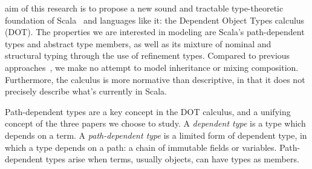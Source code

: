 \documentclass[10pt,journal,a4paper]{IEEEtran}
\begin{document}

 aim of this research is to propose a new sound
and tractable type-theoretic foundation of Scala~\cite{ScalaOverview} and languages like
it: the Dependent Object Types calculus (DOT). The properties we are
interested in modeling are Scala's path-dependent types and abstract
type members, as well as its mixture of nominal and structural typing
through the use of refinement types. Compared to previous
approaches~\cite{nuObj,FS}, we make no attempt to model inheritance or
mixing composition. Furthermore, the calculus is more normative than
descriptive, in that it does not precisely describe what's currently
in Scala.

Path-dependent types are a key concept in the DOT calculus, and a
unifying concept of the three papers we choose to study. A {\it
  dependent type} is a type which depends on a term. A {\it
  path-dependent type} is a limited form of dependent type, in which a
type depends on a path: a chain of immutable fields or
variables. Path-dependent types arise when terms, usually objects, can
have types as members.




\end{document}
